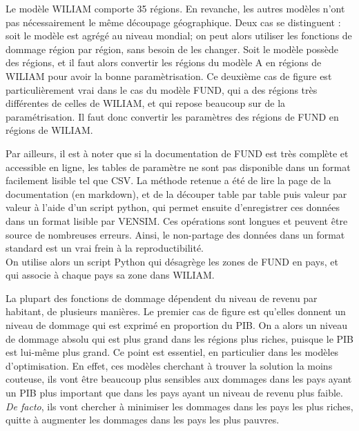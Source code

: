 \begin{methodbox}

    Le modèle WILIAM comporte 35 régions. En revanche, les autres modèles n'ont pas nécessairement le même découpage géographique. Deux cas se distinguent : soit le modèle est agrégé au niveau mondial; on peut alors utiliser les fonctions de dommage région par région, sans besoin de les changer. Soit le modèle possède des régions, et il faut alors convertir les régions du modèle A en régions de WILIAM pour avoir la bonne paramètrisation. Ce deuxième cas de figure est particulièrement vrai dans le cas du modèle FUND, qui a des régions très différentes de celles de WILIAM, et qui repose beaucoup sur de la paramétrisation. Il faut donc convertir les paramètres des régions de FUND en régions de WILIAM. 

    Par ailleurs, il est à noter que si la documentation de FUND est très complète et accessible en ligne, les tables de paramètre ne sont pas disponible dans un format facilement lisible tel que CSV. La méthode retenue a été de lire la page de la documentation (en markdown), et de la découper table par table puis valeur par valeur à l'aide d'un script python, qui permet ensuite d'enregistrer ces données dans un format lisible par VENSIM. Ces opérations sont longues et peuvent être source de nombreuses erreurs. Ainsi, le non-partage des données dans un format standard est un vrai frein à la reproductibilité. \\
    
    On utilise alors un script Python qui désagrège les zones de FUND en pays, et qui associe à chaque pays sa zone dans WILIAM. 
    
\end{methodbox}

La plupart des fonctions de dommage dépendent du niveau de revenu par habitant, de plusieurs manières. Le premier cas de figure est qu'elles donnent un niveau de dommage qui est exprimé en proportion du PIB. On a alors un niveau de dommage absolu qui est plus grand dans les régions plus riches, puisque le PIB est lui-même plus grand. Ce point est essentiel, en particulier dans les modèles d'optimisation. En effet, ces modèles cherchant à trouver la solution la moins couteuse, ils vont être beaucoup plus sensibles aux dommages dans les pays ayant un PIB plus important que dans les pays ayant un niveau de revenu plus faible. \emph{De facto}, ils vont chercher à minimiser les dommages dans les pays les plus riches, quitte à augmenter les dommages dans les pays les plus pauvres. \\

